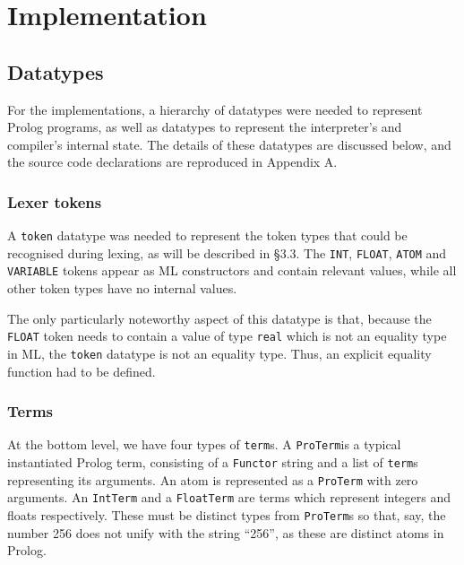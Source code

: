 \documentclass[12pt]{article}
\begin{document}
\newpage

\section{Implementation}


\subsection{Datatypes}

For the implementations, a hierarchy of datatypes were needed to represent Prolog programs, as well as datatypes to represent the interpreter's and compiler's internal state. The details of these datatypes are discussed below, and the source code declarations are reproduced in Appendix A.

\subsubsection{Lexer tokens}

A \verb|token| datatype was needed to represent the token types that could be recognised during lexing, as will be described in \S3.3. 
The \verb|INT|, \verb|FLOAT|, \verb|ATOM| and \verb|VARIABLE| tokens appear as ML constructors and contain relevant values, while all other token types have no internal values. 

The only particularly noteworthy aspect of this datatype is that, because the \verb|FLOAT| token needs to contain a value of type \verb|real| which is not an equality type in ML, the \verb|token| datatype is not an equality type. 
Thus, an explicit equality function had to be defined.

\subsubsection{Terms}

At the bottom level, we have four types of \verb|term|s. 
A \verb|ProTerm|\footnotemark[1] is a typical instantiated Prolog term, consisting of a \verb|Functor| string and a list of \verb|term|s representing its arguments. 
An atom is represented as a \verb|ProTerm| with zero arguments.
An \verb|IntTerm| and a \verb|FloatTerm| are terms which represent integers and floats respectively. 
These must be distinct types from \verb|ProTerm|s so that, say, the number 256 does not unify with the string ``256'', as these are distinct atoms in Prolog.
\end{document}
